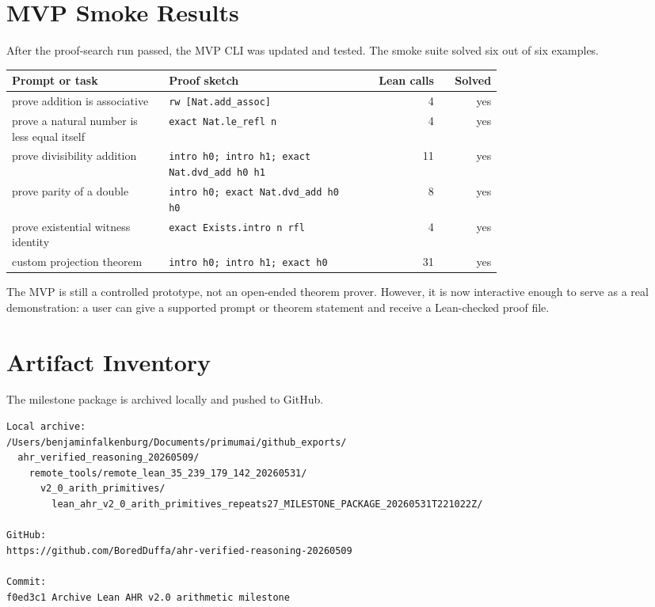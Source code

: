 \documentclass[11pt]{article}
\begin{document}
\section{MVP Smoke Results}

After the proof-search run passed, the MVP CLI was updated and tested. The smoke suite solved six out of six examples.

\begin{center}
\small
\begin{tabular}{p{0.32\linewidth}p{0.40\linewidth}rr}
\toprule
Prompt or task & Proof sketch & Lean calls & Solved \\
\midrule
prove addition is associative & \texttt{rw [Nat.add\_assoc]} & 4 & yes \\
prove a natural number is less equal itself & \texttt{exact Nat.le\_refl n} & 4 & yes \\
prove divisibility addition & \texttt{intro h0; intro h1; exact Nat.dvd\_add h0 h1} & 11 & yes \\
prove parity of a double & \texttt{intro h0; exact Nat.dvd\_add h0 h0} & 8 & yes \\
prove existential witness identity & \texttt{exact Exists.intro n rfl} & 4 & yes \\
custom projection theorem & \texttt{intro h0; intro h1; exact h0} & 31 & yes \\
\bottomrule
\end{tabular}
\end{center}

The MVP is still a controlled prototype, not an open-ended theorem prover. However, it is now interactive enough to
serve as a real demonstration: a user can give a supported prompt or theorem statement and receive a Lean-checked
proof file.

\section{Artifact Inventory}

The milestone package is archived locally and pushed to GitHub.

\begin{lstlisting}[style=leanstyle]
Local archive:
/Users/benjaminfalkenburg/Documents/primumai/github_exports/
  ahr_verified_reasoning_20260509/
    remote_tools/remote_lean_35_239_179_142_20260531/
      v2_0_arith_primitives/
        lean_ahr_v2_0_arith_primitives_repeats27_MILESTONE_PACKAGE_20260531T221022Z/

GitHub:
https://github.com/BoredDuffa/ahr-verified-reasoning-20260509

Commit:
f0ed3c1 Archive Lean AHR v2.0 arithmetic milestone
\end{lstlisting}
\end{document}
